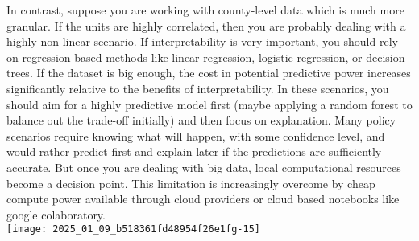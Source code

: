 \documentclass[10pt]{article}
\begin{document}
In contrast, suppose you are working with county-level data which is much more granular. If the units are highly correlated, then you are probably dealing with a highly non-linear scenario. If interpretability is very important, you should rely on regression based methods like linear regression, logistic regression, or decision trees. If the dataset is big enough, the cost in potential predictive power increases significantly relative to the benefits of interpretability. In these scenarios, you should aim for a highly predictive model first (maybe applying a random forest to balance out the trade-off initially) and then focus on explanation. Many policy scenarios require knowing what will happen, with some confidence level, and would rather predict first and explain later if the predictions are sufficiently accurate. But once you are dealing with big data, local computational resources become a decision point. This limitation is increasingly overcome by cheap compute power available through cloud providers or cloud based notebooks like google colaboratory.\\
\texttt{[image: 2025\_01\_09\_b518361fd48954f26e1fg-15]}
\end{document}
